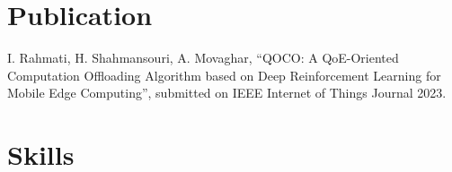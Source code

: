 \documentclass[11pt]{article}
\begin{document}
\section {Publication}
 I. Rahmati, H. Shahmansouri, A. Movaghar, ``QOCO: A QoE-Oriented Computation Offloading Algorithm based on Deep Reinforcement Learning for Mobile Edge Computing'', submitted on IEEE Internet of Things Journal 2023.



\section{Skills}


\end{document}
